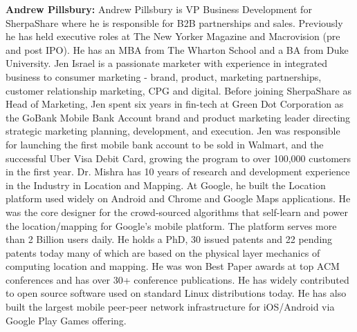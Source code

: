 \newline
\newline
\noindent
{\bf Andrew Pillsbury:}
Andrew Pillsbury is VP Business Development for SherpaShare where he is responsible for B2B partnerships and sales. Previously he has held executive roles at The New Yorker Magazine and Macrovision (pre and post IPO). He has an MBA from The Wharton School and a BA from Duke University.
\newline
\newline
{}
Jen Israel is a passionate marketer with experience in integrated business to consumer marketing - brand, product,
marketing partnerships, customer relationship marketing, CPG and digital. Before joining SherpaShare as Head of
Marketing, Jen spent six years in fin-tech at Green Dot Corporation as the GoBank Mobile Bank Account brand and product
marketing leader directing strategic marketing planning, development, and execution.  Jen was responsible for launching
the first mobile bank account to be sold in Walmart, and the successful Uber Visa Debit Card, growing the program to
over 100,000 customers in the first year.
\newline
\newline
{} Dr. Mishra has 10 years of research and development experience in the Industry in
Location and Mapping. At Google, he built the Location platform used widely on Android and Chrome and Google Maps
applications. He was the core designer for the crowd-sourced algorithms that self-learn and power the location/mapping
for Google's mobile platform. The platform serves more than 2 Billion users daily. He holds a PhD, 30 issued patents and
22 pending patents today many of which are based on the physical layer mechanics of computing location and mapping. He
was won Best Paper awards at top ACM conferences and has over 30+ conference publications. He has widely contributed to
open source software used on standard Linux distributions today. He has also built the largest mobile peer-peer network
infrastructure for iOS/Android via Google Play Games offering.
